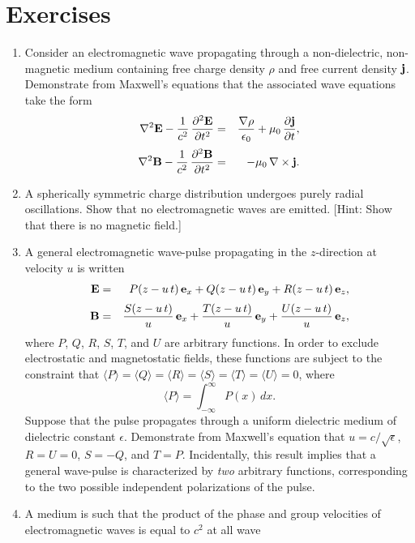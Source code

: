 {\small
\section{Exercises}
\renewcommand{\theenumi}{9.\arabic{enumi}}
\begin{enumerate}
\item Consider an electromagnetic wave propagating through a
non-dielectric, non-magnetic medium containing free charge
density $\rho$ and free current density ${\bf j}$. Demonstrate
from Maxwell's equations that the associated wave equations
take the form
\begin{eqnarray}
\nabla^2{\bf E} - \frac{1}{c^2}\,\frac{\partial^2 {\bf E}}{\partial t^2} &=& \frac{\nabla \rho}{\epsilon_0} + \mu_0\,\frac{\partial {\bf j}}{\partial t},\nonumber\\[0.5ex]
\nabla^2{\bf B} - \frac{1}{c^2}\,\frac{\partial^2 {\bf B}}{\partial t^2} &=& 
- \mu_0\,\nabla\times{\bf j}.\nonumber
\end{eqnarray}
\item A spherically symmetric charge distribution undergoes purely
radial oscillations. Show that no electromagnetic waves are emitted. [Hint: Show that there is no magnetic field.]
\item A general electromagnetic wave-pulse propagating in the $z$-direction at velocity $u$
is written
\begin{eqnarray}
{\bf E} &= &P(z-u\,t)\,{\bf e}_x + Q(z-u\,t)\,{\bf e}_y+ R(z-u\,t)\,{\bf e}_z,\nonumber\\[0.5ex]
{\bf B} &= &\frac{S(z-u\,t)}{u}\,{\bf e}_x + \frac{T(z-u\,t)}{u}\,{\bf e}_y+ \frac{U(z-u\,t)}{u}\,{\bf e}_z,\nonumber
\end{eqnarray}
where $P$, $Q$, $R$, $S$, $T$, and $U$ are arbitrary functions. In order
to exclude electrostatic and magnetostatic fields, these functions are subject to
the constraint that $\langle P\rangle=\langle Q\rangle=\langle R\rangle=\langle S\rangle=\langle T\rangle=\langle U\rangle =0$, where
$$
\langle P\rangle = \int_{-\infty}^{\infty}P(x)\,dx.
$$
Suppose that the pulse propagates through a uniform dielectric medium of
dielectric constant $\epsilon$. Demonstrate from Maxwell's equation that
$u = c/\sqrt{\epsilon}$, $R=U=0$, $S=-Q$, and $T=P$. Incidentally, this result implies that a general
wave-pulse is characterized by {\em two}\/ arbitrary functions, corresponding
to the two possible independent polarizations of the pulse.
\item A medium is such that the product of the phase and group
velocities of electromagnetic waves is equal to $c^2$ at all wave

\end{enumerate}}
